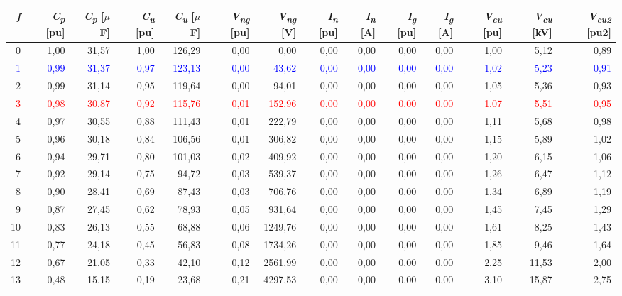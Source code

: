 \begin{tabular}{rrrrrrrrrrrrrr}
\toprule
\textit{\textbf{f}} & \textbf{\textit{C\textsubscript{p}} [pu]} & \textbf{\textit{C\textsubscript{p}} [$\mu$F]} & \textbf{\textit{C\textsubscript{u}} [pu]} & \textbf{\textit{C\textsubscript{u}} [$\mu$F]} & \textbf{\textit{V\textsubscript{ng}} [pu]} & \textbf{\textit{V\textsubscript{ng}} [V]} & \textbf{\textit{I\textsubscript{n}} [pu]} & \textbf{\textit{I\textsubscript{n}} [A]} & \textbf{\textit{I\textsubscript{g}} [pu]} & \textbf{\textit{I\textsubscript{g}} [A]} & \textbf{\textit{V\textsubscript{cu}} [pu]} & \textbf{\textit{V\textsubscript{cu}} [kV]} & \textbf{\textit{V\textsubscript{cu2}} [pu2]} \\
\midrule
0 & 1,00 & 31,57 & 1,00 & 126,29 & 0,00 & 0,00 & 0,00 & 0,00 & 0,00 & 0,00 & 1,00 & 5,12 & 0,89 \\
\textcolor{blue}{1} & \textcolor{blue}{0,99} & \textcolor{blue}{31,37} & \textcolor{blue}{0,97} & \textcolor{blue}{123,13} & \textcolor{blue}{0,00} & \textcolor{blue}{43,62} & \textcolor{blue}{0,00} & \textcolor{blue}{0,00} & \textcolor{blue}{0,00} & \textcolor{blue}{0,00} & \textcolor{blue}{1,02} & \textcolor{blue}{5,23} & \textcolor{blue}{0,91} \\
2 & 0,99 & 31,14 & 0,95 & 119,64 & 0,00 & 94,01 & 0,00 & 0,00 & 0,00 & 0,00 & 1,05 & 5,36 & 0,93 \\
\textcolor{red}{3} & \textcolor{red}{0,98} & \textcolor{red}{30,87} & \textcolor{red}{0,92} & \textcolor{red}{115,76} & \textcolor{red}{0,01} & \textcolor{red}{152,96} & \textcolor{red}{0,00} & \textcolor{red}{0,00} & \textcolor{red}{0,00} & \textcolor{red}{0,00} & \textcolor{red}{1,07} & \textcolor{red}{5,51} & \textcolor{red}{0,95} \\
4 & 0,97 & 30,55 & 0,88 & 111,43 & 0,01 & 222,79 & 0,00 & 0,00 & 0,00 & 0,00 & 1,11 & 5,68 & 0,98 \\
5 & 0,96 & 30,18 & 0,84 & 106,56 & 0,01 & 306,82 & 0,00 & 0,00 & 0,00 & 0,00 & 1,15 & 5,89 & 1,02 \\
6 & 0,94 & 29,71 & 0,80 & 101,03 & 0,02 & 409,92 & 0,00 & 0,00 & 0,00 & 0,00 & 1,20 & 6,15 & 1,06 \\
7 & 0,92 & 29,14 & 0,75 & 94,72 & 0,03 & 539,37 & 0,00 & 0,00 & 0,00 & 0,00 & 1,26 & 6,47 & 1,12 \\
8 & 0,90 & 28,41 & 0,69 & 87,43 & 0,03 & 706,76 & 0,00 & 0,00 & 0,00 & 0,00 & 1,34 & 6,89 & 1,19 \\
9 & 0,87 & 27,45 & 0,62 & 78,93 & 0,05 & 931,64 & 0,00 & 0,00 & 0,00 & 0,00 & 1,45 & 7,45 & 1,29 \\
10 & 0,83 & 26,13 & 0,55 & 68,88 & 0,06 & 1249,76 & 0,00 & 0,00 & 0,00 & 0,00 & 1,61 & 8,25 & 1,43 \\
11 & 0,77 & 24,18 & 0,45 & 56,83 & 0,08 & 1734,26 & 0,00 & 0,00 & 0,00 & 0,00 & 1,85 & 9,46 & 1,64 \\
12 & 0,67 & 21,05 & 0,33 & 42,10 & 0,12 & 2561,99 & 0,00 & 0,00 & 0,00 & 0,00 & 2,25 & 11,53 & 2,00 \\
13 & 0,48 & 15,15 & 0,19 & 23,68 & 0,21 & 4297,53 & 0,00 & 0,00 & 0,00 & 0,00 & 3,10 & 15,87 & 2,75 \\
\bottomrule
\end{tabular}